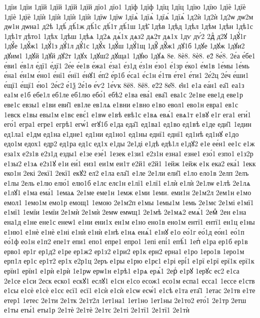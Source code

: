 {1дїи
1дїи
1дїй
1дїй
1дїй
1дїй
дїо1
дїо1
1дїф
1дїф
1дїц
1дїц
1дїю
1дїю
1дїѐ
1дїѐ
1дїѐ
1дїѐ
1дїѝ
1дїѝ
1дїѝ
1дїѝ
1дїѡ
1дїѡ
1дїѧ̀
1дїѧ̀
1дїѧ́
1дїѧ́
1д2ѝ
1д2ѝ
1д2ѡ
дѡ2м
дѡ1н
дѡна1
д2ѣ
1дѣ́
дѣ́1ж
дѣ́1с
дѣ́1т
дѣ́1ш
1дѣ̑
1дѣв
1дѣд
1дѣл
1дѣм
1дѣн
1дѣ1с
1дѣ1т
дѣто1
1дѣх
1дѣш
1дѣѧ
1д2ѧ
дѧ́1х
дѧз2
дѧ2т
дѧ1х
1дѵ
дѵ́2
2дⷧ
д2ꙋ
1дꙋ́1г
1дꙋ́е
1дꙋ́ж1
1дꙋ́1з
дꙋ́1л
дꙋ́1с
1дꙋ́х
1дꙋ́ш
1дꙋ́1щ
1дꙋ̑
дꙋ̑ж1
дꙋ1б
1дꙋе
1дꙋж
1дꙋи2
дꙋим1
1дꙋй
1дꙋй
дꙋ2т
1дꙋх
1дꙋш2
дꙋща1
1дꙋю
1дꙋѧ
8е.
8ѐ8.
8ѐ8.
е2́
8е́8.
2е́а
е́бе1
е́ви1
е́в1л
е́дї1
е́дї1
2е́е
е́е1в
е́жа1
е́за1
е́з1д
е́з1н
е́зо1
е́1зр
е́ко1
е́м1в
1е́мы
1е́мь
е́на1
е́н1м
е́но1
е́нї1
е́нї1
е́нꙋ1
е́п2
е́р1б
е́са1
е́с1н
е́1тв
е́те1
е́ти1
2е́2ц
2е́ч
е́ши1
е́щї1
е́щї1
е́ю1
2е́є2
е́1ѯ
2е́1ѳ
е́ѵ2
1е́ѵк
8ё8.
8ё8.
е2̑2
8е̑8.
е̑н1
е1а
еа́н1
еа̑1
еа1з
еа1м
е1б
ебе1л
еб1ле
еб1лю
ебо́1
ебѣ2
е1ва
ева́1
ева̑1
ева1с
2е1ве
еве1д
еве1р
еве1с
евзы1
е1ви
еви̑1
ев1ле
ев1лѧ
е1вни
е1вно
е1во
евол1
ево1н
евра1
ев1с
1евск
е1вы
евы1м
е1вє
евє́1
е1вѡ
е1вѣ
евѣ1с
е1вѧ
евѧ́1
евѧ1т
е1вꙋ
е1г
ега1
еги́1
его́1
егра1
егре1
егрѣ1
егѡ́1
егꙋ1б
е1да
еда̑1
ед1ва1
ед1во
ед1вѣ
е1де
еди̑1
1един
ед1ла1
е1дм
ед1на
е1дне1
ед1ни
ед1но1
ед1ны
еднї1
еднї1
ед1нѣ
ед1нꙋ
е1до
едо1м
едох1
едр2
ед1ра
ед1с
ед1х
е1ды
2е1ді
е1дѣ
едѣ1л
е1дꙋ2
е1е
ее́н1
ее1с
е1ж
еза1х
е2з1в
е2з1д
езды1
е1зе
езе́1
1езек
е1зи1
е2з1н
езна1
езне1
езо́1
езпо1
е1з2р
е1зы2
е1зѧ
е2з1ꙋ
е1и
еи́1
еиз1
еи1м
еи1т
е2й1
е2й1
1ейж
1ейж
е1к
ека2
ека́1
1екк
еко1н
2екі
2екї1
2екї1
екꙋ2
ел2
е1ла
ела̑1
е1ле
2е1ли
ели̑1
е1ло
ело1в
2елп
2елъ
е1лы
2ель
е1лю
елю́1
елю1б
е1лє
елє1н
е1лї1
е1лї1
е1лѝ
е1лѝ
2е1лѡ
е1лѣ
2е1лѧ
е1лꙋ1
е1ма
ема́1
1емаѧ
2е1ме
еме1н
1емж
е1ми
1еми.
еми1н
2е1м2л
2ем1н
е1мо
емол1
1емо1м
емо1р
емощ1
1емою
2е1м2п
е1мы
1емы1м
1емь
2е1мє
2е1мі
е1мї1
е1мї1
1емїи
1емїи
2е1мѝ
2е1мѝ
2емѡ
емѡщ1
2е1мѣ
2е1мѧ2
емѧ́1
2емⷣ
2ен
е1на
ена1д
е1не
ене1с
енеѡ1
е1ни
ени1х
ен1м
е1но
ено1в
ено1м
ентї1
ентї1
ен1ц
е1ны
е1ню1
е1нѐ
е1нѐ
е1ні
е1нѝ
е1нѝ
е1нѣ
е1нѧ
енѧ́1
е1нꙋ
е1о
ео́1г
ео́1д
ео́н1
ео́1п
ео́1ф
ео1н
е1п2
епе1т
епи1
епо1
епре1
епро1
1епі
епі́1
епѣ́1
1епⷭ
е1ра
ер1б
ер1в
ерво1
ер1г
ер1д2
е1ре
ер1ж2
ер1з2
е1ри2
ер1к
ерн2
ерна1
е1ро
1еро1в
1еро1м
ерп1л
ер1с
ер1т2
ер1х
е2р1ц
2еръ
е1ры
е1рю
е1рє1
е1рі
ері́1
е1рї
е1рї
ерї1к
ерї1к
ерїн1
ерїн1
е1рѝ
е1рѝ
1е1рѡ
ерѡ1н
е1рѣ1
е1рѧ
ерѧ́1
2ерⷭ
е1рꙋ
1ерꙋс
ес2
е1са
2е1се
е1си
2еск
еско1
ескꙋ1
еслꙋ1
е1сн
е1со
есож1
есо1м
еспа1
есса1
1ессе
е1ств
е1сы
е1сѐ
е1сѐ
е1сє
есї1
есї1
е1сѝ
е1сѝ
е1сѡ
есѡ́1
е1сѣ
е1та
ета̑1
1етас
2е1тв
е1те
етер1
1етес
2е1ти
2е1тк
2е1т2л
1ет1на1
1ет1но
1ет1ны
2е1то2
ето́1
2е1тр
2етш
е1ты
еты́1
еты1р
2е1тѐ
2е1тѐ
2е1тє
2е1ті
2е1тї1
2е1тї1
2е1тѝ
}
